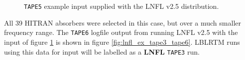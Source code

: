 \begin{figure}[htp]
  \centering
  \caption{\texttt{TAPE5} example input supplied with the LNFL v2.5 distribution.}
  \label{fig:lnfl_ex_tape3_tape5}
\end{figure}

All 39 HITRAN absorbers were selected in this case, but over a much smaller frequency range. The \texttt{TAPE6} logfile output from running LNFL v2.5 with the input of figure \ref{fig:lnfl_ex_tape3_tape5} is shown in figure \ref{fig:lnfl_ex_tape3_tape6}. LBLRTM runs using this data for input will be labelled as a \textbf{LNFL} \texttt{TAPE3} run.

